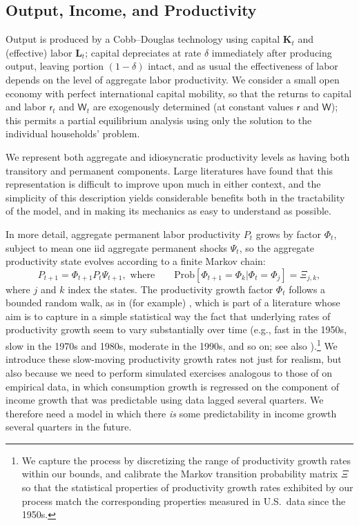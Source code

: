 \documentclass[titlepage]{article}
\begin{document}
\subsection{Output, Income, and Productivity}

Output is produced by a Cobb--Douglas technology using capital $\mathbf{K}_t$ and (effective) labor $\mathbf{L}_t$; capital depreciates at rate $\delta$ immediately after producing output, leaving portion $(1-\delta)$ intact, and as usual the effectiveness of labor depends on the level of aggregate labor productivity.  We consider a small open economy with perfect international capital mobility, so that the returns to capital and labor $\mathsf{r}_t$ and $\mathsf{W}_t$ are exogenously determined (at constant values $\mathsf{r}$ and $\mathsf{W}$); this permits a partial equilibrium analysis using only the solution to the individual households' problem. 

We represent both aggregate and idiosyncratic productivity levels as having both transitory and permanent components.  Large literatures have found that this representation is difficult to improve upon much in either context, and the simplicity of this description yields considerable benefits both in the tractability of the model, and in making its mechanics as easy to understand as possible.

In more detail, aggregate permanent labor productivity $P_t$ grows by factor $\Phi_t$, subject to mean one iid aggregate permanent shocks $\Psi_t$, so the aggregate productivity state evolves according to a finite Markov chain:
\begin{equation}
{P}_{t+1} = \Phi_{t+1} {P}_{t}\Psi_{t+1}, \text{ where} \qquad\text{Prob}[\Phi_{t+1}=\Phi_k | \Phi_t = \Phi_j] = \Xi_{j,k},   \label{eq:AggRandWalk}
\end{equation}
where $j$ and $k$ index the states. The productivity growth factor $\Phi_t$ follows a bounded random walk, as in (for example) \cite{edge2007Learning}, which is part of a literature whose aim is to capture in a simple statistical way the fact that underlying rates of productivity growth seem to vary substantially over time (e.g., fast in the 1950s, slow in the 1970s and 1980s, moderate in the 1990s, and so on; see also \cite{jorgenson:ProductivityGrowthResurgence}).\footnote{We capture the process by discretizing the range of productivity growth rates within our bounds, and calibrate the Markov transition probability matrix $\Xi$ so that the statistical properties of productivity growth rates exhibited by our process match the corresponding properties measured in U.S.\ data since the 1950s.}  We introduce these slow-moving productivity growth rates not just for realism, but also because we need to perform simulated exercises analogous to those of \cite{cmModel} on empirical data, in which consumption growth is regressed on the component of income growth that was predictable using data lagged several quarters.  We therefore need a model in which there {\it is} some predictability in income growth several quarters in the future.
\end{document}
